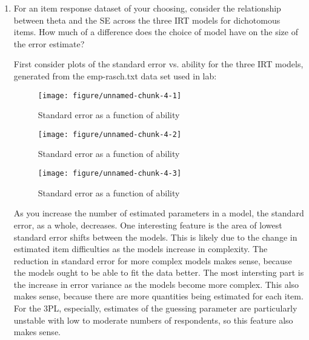 \documentclass{article}\usepackage[]{graphicx}\usepackage[]{color}
\makeatletter
\def\maxwidth{ %
  \ifdim\Gin@nat@width>\linewidth
    \linewidth
  \else
    \Gin@nat@width
  \fi
}
\newenvironment{knitrout}{}{} %
\makeatother
\begin{document}
\begin{enumerate}
\item For an item response dataset of your choosing, consider the relationship between theta and the SE across the three IRT models for dichotomous items. How much of a difference does the choice of model have on the size of the error estimate?

First consider plots of the standard error vs. ability for the three IRT models, generated from the emp-rasch.txt data set used in lab:

\begin{knitrout}
\color{fgcolor}\begin{figure}[H]

{\centering \texttt{[image: figure/unnamed-chunk-4-1]} 

}

\caption[Standard error as a function of ability]{Standard error as a function of ability}\label{fig:unnamed-chunk-41}
\end{figure}

\begin{figure}[H]

{\centering \texttt{[image: figure/unnamed-chunk-4-2]} 

}

\caption[Standard error as a function of ability]{Standard error as a function of ability}\label{fig:unnamed-chunk-42}
\end{figure}

\begin{figure}[H]

{\centering \texttt{[image: figure/unnamed-chunk-4-3]} 

}

\caption[Standard error as a function of ability]{Standard error as a function of ability}\label{fig:unnamed-chunk-43}
\end{figure}


\end{knitrout}

As you increase the number of estimated parameters in a model, the standard error, as a whole, decreases.  One interesting feature is the area of lowest standard error shifts between the models.  This is likely due to the change in estimated item difficulties as the models increase in complexity.  The reduction in standard error for more complex models makes sense, because the models ought to be able to fit the data better.  The most intersting part is the increase in error variance as the models become more complex.  This also makes sense, because there are more quantities being estimated for each item.  For the 3PL, especially, estimates of the guessing parameter are particularly unstable with low to moderate numbers of respondents, so this feature also makes sense.


\end{enumerate}
\end{document}
